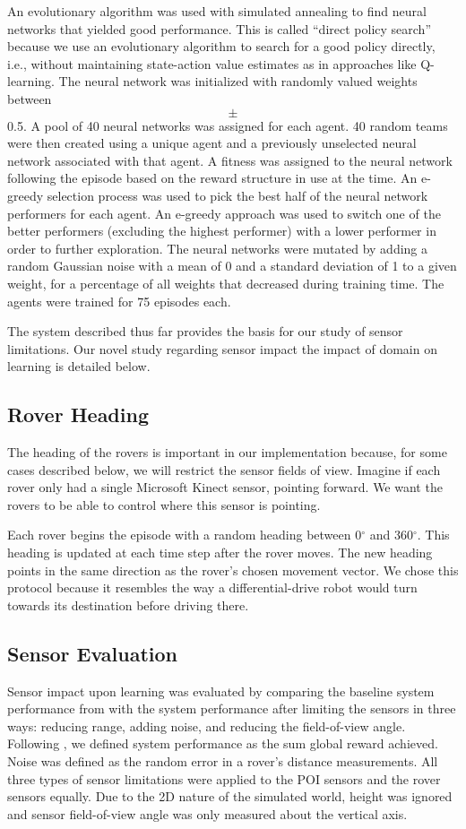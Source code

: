 \documentclass[letterpaper, 10 pt, conference]{ieeeconf}  %
\begin{document}
An evolutionary algorithm was used with simulated annealing to find
neural networks that yielded good performance. This is called “direct
policy search” because we use an evolutionary algorithm to search for
a good policy directly, i.e., without maintaining state-action value
estimates as in approaches like Q-learning. The neural network was initialized with randomly
valued weights between \[\pm\]0.5.  A pool of 40 neural networks was assigned for each agent.  40 random
teams were then created using a unique agent and a previously unselected neural network associated with that agent.
A fitness was assigned to the neural network following the episode based on the reward structure in use at 
the time.  An e-greedy selection process was used to pick the best half of the neural network performers for each agent.  An 
e-greedy approach was used to switch one of the better performers (excluding the highest performer) with a lower performer in 
order to further exploration.  The neural networks were mutated by adding a random Gaussian noise with a mean of 0 and a standard deviation of 1 to a given weight, for a percentage of all weights that decreased during training time.
The agents were trained for 75 episodes each.

The system described thus far provides the basis for our study of sensor limitations. Our novel
study regarding sensor impact the impact of domain on learning is detailed below.

\subsection{Rover Heading}
The heading of the rovers is important in our implementation because, for some cases described below, we will restrict the sensor fields of view. Imagine if each rover only had a single Microsoft Kinect sensor, pointing forward. We want the rovers to be able to control where this sensor is pointing. 

Each rover begins the episode with a random heading between 0$^{\circ}$ and 360$^{\circ}$. This heading is updated at each time step after the rover moves. The new heading points in the same direction as the rover's chosen movement vector. We chose this protocol because it resembles the way a differential-drive robot would turn towards its destination before driving there. 

\subsection{Sensor Evaluation}
Sensor impact upon learning was evaluated by comparing the baseline
system performance from \cite{agogino2008analyzing} with the system performance after limiting
the sensors in three ways: reducing range, adding noise, and reducing
the field-of-view angle.  Following \cite{agogino2008analyzing}, we defined system performance
as the sum global reward achieved.  Noise was defined as the random
error in a rover’s distance measurements. All three types of sensor
limitations were applied to the POI sensors and the rover sensors
equally. Due to the 2D nature of the simulated world, height was
ignored and sensor field-of-view angle was only measured about the
vertical axis.
\end{document}
